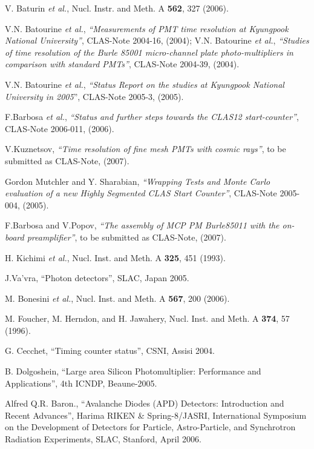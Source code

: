 \begin{thebibliography}{199}
V. Baturin {\it et al.}, Nucl. Instr. and Meth. A {\bf 562}, 327 (2006).

V.N. Batourine {\it et al.}, {\it ``Measurements of PMT time resolution 
at Kyungpook National University''}, CLAS-Note 2004-16, (2004);
V.N. Batourine {\it et al.}, {\it ``Studies of time resolution of the 
Burle 85001 micro-channel plate photo-multipliers in comparison with 
standard PMTs''}, CLAS-Note 2004-39, (2004).

V.N. Batourine {\it et al.}, {\it ``Status Report on the studies at 
Kyungpook National University in 2005}'', CLAS-Note 2005-3, (2005).

F.Barbosa {\it et al.}, {\it ``Status and further steps towards the CLAS12 
start-counter''}, CLAS-Note 2006-011, (2006).

V.Kuznetsov, {\it ``Time resolution of fine mesh PMTs with cosmic rays''},
to be submitted as CLAS-Note, (2007).

Gordon Mutchler and Y. Sharabian, {\it ``Wrapping Tests and Monte Carlo 
evaluation of a new Highly Segmented CLAS Start Counter''},
CLAS-Note 2005-004, (2005).

F.Barbosa and V.Popov, {\it ``The assembly of MCP PM Burle85011 with the 
on-board preamplifier''}, to be submitted as CLAS-Note, (2007).

H. Kichimi {\it et al.}, Nucl. Inst. and Meth. A {\bf 325}, 451 (1993).

 J.Va'vra, ``Photon detectors'', SLAC, Japan 2005.

M. Bonesini {\it et al.}, Nucl. Inst. and Meth. A {\bf 567}, 200 (2006).

M. Foucher, M. Herndon, and H. Jawahery, Nucl. Inst. and Meth. A 
{\bf 374}, 57 (1996).

G. Cecchet, ``Timing counter status'', CSNI, Assisi 2004.

B. Dolgoshein, ``Large area Silicon Photomultiplier: Performance and 
Applications'', 4th ICNDP, Beaune-2005.

Alfred Q.R. Baron., ``Avalanche Diodes (APD) Detectors: Introduction 
and Recent Advances'', Harima RIKEN \& Spring-8/JASRI, International 
Symposium on the Development of Detectors for Particle, Astro-Particle, 
and Synchrotron Radiation Experiments, SLAC, Stanford, April 2006.


\end{thebibliography}
